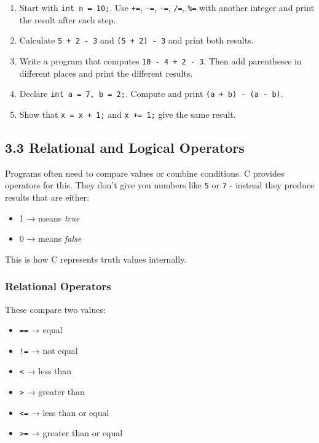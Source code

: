 \documentclass[
  letterpaper,
  DIV=11,
  numbers=noendperiod]{scrreprt}
\providecommand{\tightlist}{%
  \setlength{\itemsep}{0pt}\setlength{\parskip}{0pt}}
\begin{document}
\begin{enumerate}
\def\labelenumi{\arabic{enumi}.}
\tightlist
\item
  Start with \texttt{int\ n\ =\ 10;}. Use \texttt{+=}, \texttt{-=},
  \texttt{-=}, \texttt{/=}, \texttt{\%=} with another integer and print
  the result after each step.
\item
  Calculate \texttt{5\ +\ 2\ -\ 3} and \texttt{(5\ +\ 2)\ -\ 3} and
  print both results.
\item
  Write a program that computes \texttt{10\ -\ 4\ +\ 2\ -\ 3}. Then add
  parentheses in different places and print the different results.
\item
  Declare \texttt{int\ a\ =\ 7,\ b\ =\ 2;}. Compute and print
  \texttt{(a\ +\ b)\ -\ (a\ -\ b)}.
\item
  Show that \texttt{x\ =\ x\ +\ 1;} and \texttt{x\ +=\ 1;} give the same
  result.
\end{enumerate}

\subsection{3.3 Relational and Logical
Operators}\label{relational-and-logical-operators}

Programs often need to compare values or combine conditions. C provides
operators for this. They don't give you numbers like \texttt{5} or
\texttt{7} - instead they produce results that are either:

\begin{itemize}
\tightlist
\item
  1 → means \emph{true}
\item
  0 → means \emph{false}
\end{itemize}

This is how C represents truth values internally.

\subsubsection{Relational Operators}\label{relational-operators}

These compare two values:

\begin{itemize}
\tightlist
\item
  \texttt{==} → equal
\item
  \texttt{!=} → not equal
\item
  \texttt{\textless{}} → less than
\item
  \texttt{\textgreater{}} → greater than
\item
  \texttt{\textless{}=} → less than or equal
\item
  \texttt{\textgreater{}=} → greater than or equal
\end{itemize}
\end{document}
